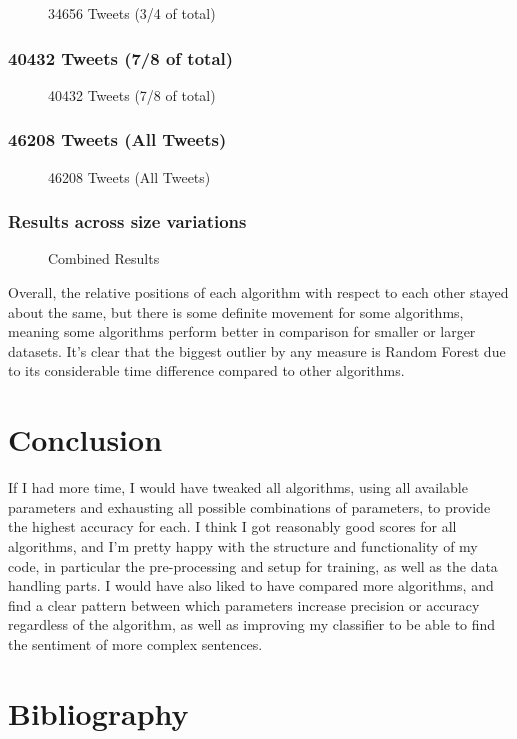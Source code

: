 \documentclass{article}
\begin{document}
\begin{figure}[H]
	\caption{34656 Tweets (3/4 of total)}
\end{figure}

\subsubsection{40432 Tweets (7/8 of total)}

\begin{figure}[H]
	\caption{40432 Tweets (7/8 of total)}
\end{figure}

\subsubsection{46208 Tweets (All Tweets)}

\begin{figure}[H]
	\caption{46208 Tweets (All Tweets)}
\end{figure}

\subsubsection{Results across size variations}

\begin{figure}[H]
	\caption{Combined Results}
\end{figure}

Overall, the relative positions of each algorithm with respect to each other stayed about the same, but there is some definite movement for some algorithms, meaning some algorithms perform better in comparison for smaller or larger datasets.
It's clear that the biggest outlier by any measure is Random Forest due to its considerable time difference compared to other algorithms.

\section{Conclusion}

If I had more time, I would have tweaked all algorithms, using all available parameters and exhausting all possible combinations of parameters, to provide the highest accuracy for each.
I think I got reasonably good scores for all algorithms, and I'm pretty happy with the structure and functionality of my code, in particular the pre-processing and setup for training, as well as the data handling parts.
I would have also liked to have compared more algorithms, and find a clear pattern between which parameters increase precision or accuracy regardless of the algorithm, as well as improving my classifier to be able to find the sentiment of more complex sentences.

\section{Bibliography}

\printbibliography
\end{document}
